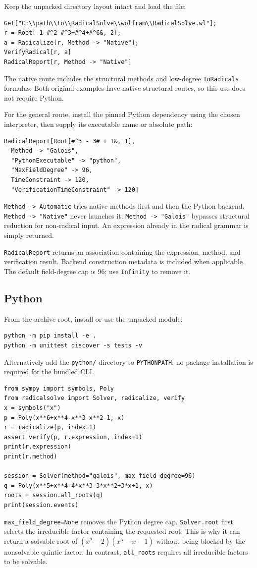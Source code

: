 \documentclass[11pt]{article}
\theoremstyle{definition}\newtheorem{definition}[theorem]{Definition}
\theoremstyle{remark}\newtheorem{remark}[theorem]{Remark}
\newcommand{\code}[1]{\texttt{#1}}
\begin{document}
Keep the unpacked directory layout intact and load the file:
\begin{lstlisting}
Get["C:\\path\\to\\RadicalSolve\\wolfram\\RadicalSolve.wl"];
r = Root[-1-#^2-#^3+#^4+#^6&, 2];
a = Radicalize[r, Method -> "Native"];
VerifyRadical[r, a]
RadicalReport[r, Method -> "Native"]
\end{lstlisting}
The native route includes the structural methods and low-degree
\code{ToRadicals} formulas. Both original examples have native structural
routes, so this use does not require Python.

For the general route, install the pinned Python dependency using the chosen
interpreter, then supply its executable name or absolute path:
\begin{lstlisting}
RadicalReport[Root[#^3 - 3# + 1&, 1],
  Method -> "Galois",
  "PythonExecutable" -> "python",
  "MaxFieldDegree" -> 96,
  TimeConstraint -> 120,
  "VerificationTimeConstraint" -> 120]
\end{lstlisting}
\code{Method -> Automatic} tries native methods first and then the Python
backend. \code{Method -> "Native"} never launches it.
\code{Method -> "Galois"} bypasses structural reduction for non-radical input.
An expression already in the radical grammar is simply returned.

\code{RadicalReport} returns an association containing the expression, method,
and verification result. Backend construction metadata is included when
applicable. The default field-degree cap is 96; use \code{Infinity} to remove it.

\subsection{Python}

From the archive root, install or use the unpacked module:
\begin{lstlisting}
python -m pip install -e .
python -m unittest discover -s tests -v
\end{lstlisting}
Alternatively add the \code{python/} directory to \code{PYTHONPATH}; no package
installation is required for the bundled CLI.

\begin{lstlisting}
from sympy import symbols, Poly
from radicalsolve import Solver, radicalize, verify
x = symbols("x")
p = Poly(x**6+x**4-x**3-x**2-1, x)
r = radicalize(p, index=1)
assert verify(p, r.expression, index=1)
print(r.expression)
print(r.method)

session = Solver(method="galois", max_field_degree=96)
q = Poly(x**5+x**4-4*x**3-3*x**2+3*x+1, x)
roots = session.all_roots(q)
print(session.events)
\end{lstlisting}
\code{max\_field\_degree=None} removes the Python degree cap.
\code{Solver.root} first selects the irreducible factor containing the requested
root. This is why it can return a solvable root of
$(x^2-2)(x^5-x-1)$ without being blocked by the nonsolvable quintic factor.
In contrast, \code{all\_roots} requires all irreducible factors to be solvable.
\end{document}

